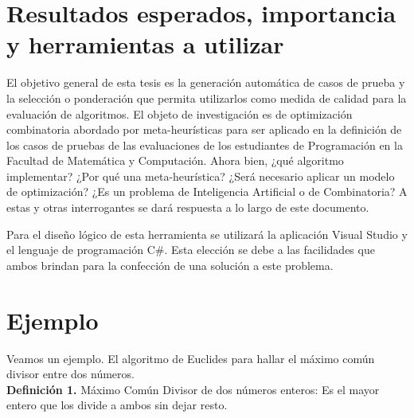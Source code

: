 \documentclass[a4paper,12pt]{book}
\begin{document}
		
	\section{Resultados esperados, importancia y herramientas a utilizar}
	
		El objetivo general de esta tesis es la generación automática de casos de prueba y la selección o ponderación que permita utilizarlos como medida de calidad para la evaluación de algoritmos. El objeto de investigación es de optimización combinatoria abordado por meta-heurísticas \cite{OptimizacionCombinatoria} para ser aplicado en la definición de los casos de pruebas de las evaluaciones de los estudiantes de Programación en la Facultad de Matemática y Computación. Ahora bien, ¿qué algoritmo implementar? ¿Por qué una meta-heurística? ¿Será necesario aplicar un modelo de optimización? ¿Es un problema de Inteligencia Artificial o de Combinatoria? A estas y otras interrogantes se dará respuesta a lo largo de este documento.
		
		Para el diseño lógico de esta herramienta se utilizará la aplicación Visual Studio y el lenguaje de programación C\#. Esta elección se debe a las facilidades que ambos brindan para la confección de una solución a este problema.
	
	
	
	
	\section{Ejemplo}
	
	Veamos un ejemplo. El algoritmo de Euclides para hallar el máximo común divisor entre dos números.\\
	
	\textbf{Definición 1.} Máximo Común Divisor de dos números enteros: Es el mayor entero que los divide a ambos sin dejar resto. \\
	
\end{document}
